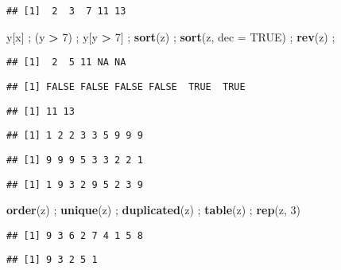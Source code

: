 \documentclass[]{article}
\newenvironment{Shaded}{\begin{snugshade}}{\end{snugshade}}
\newcommand{\DataTypeTok}[1]{\textcolor[rgb]{0.13,0.29,0.53}{#1}}
\newcommand{\DecValTok}[1]{\textcolor[rgb]{0.00,0.00,0.81}{#1}}
\newcommand{\KeywordTok}[1]{\textcolor[rgb]{0.13,0.29,0.53}{\textbf{#1}}}
\newcommand{\NormalTok}[1]{#1}
\newcommand{\OperatorTok}[1]{\textcolor[rgb]{0.81,0.36,0.00}{\textbf{#1}}}
\newcommand{\OtherTok}[1]{\textcolor[rgb]{0.56,0.35,0.01}{#1}}
\newcommand{\StringTok}[1]{\textcolor[rgb]{0.31,0.60,0.02}{#1}}
\begin{document}
\begin{verbatim}
## [1]  2  3  7 11 13
\end{verbatim}

\begin{Shaded}
\begin{Highlighting}[]
\NormalTok{y[x] ; (y }\OperatorTok{>}\StringTok{ }\DecValTok{7}\NormalTok{) ; y[y }\OperatorTok{>}\StringTok{ }\DecValTok{7}\NormalTok{] ; }\KeywordTok{sort}\NormalTok{(z) ; }\KeywordTok{sort}\NormalTok{(z, }\DataTypeTok{dec =} \OtherTok{TRUE}\NormalTok{) ; }\KeywordTok{rev}\NormalTok{(z) ;}
\end{Highlighting}
\end{Shaded}

\begin{verbatim}
## [1]  2  5 11 NA NA
\end{verbatim}

\begin{verbatim}
## [1] FALSE FALSE FALSE FALSE  TRUE  TRUE
\end{verbatim}

\begin{verbatim}
## [1] 11 13
\end{verbatim}

\begin{verbatim}
## [1] 1 2 2 3 3 5 9 9 9
\end{verbatim}

\begin{verbatim}
## [1] 9 9 9 5 3 3 2 2 1
\end{verbatim}

\begin{verbatim}
## [1] 1 9 3 2 9 5 2 3 9
\end{verbatim}

\begin{Shaded}
\begin{Highlighting}[]
\KeywordTok{order}\NormalTok{(z) ; }\KeywordTok{unique}\NormalTok{(z) ; }\KeywordTok{duplicated}\NormalTok{(z) ; }\KeywordTok{table}\NormalTok{(z) ; }\KeywordTok{rep}\NormalTok{(z, }\DecValTok{3}\NormalTok{)}
\end{Highlighting}
\end{Shaded}

\begin{verbatim}
## [1] 9 3 6 2 7 4 1 5 8
\end{verbatim}

\begin{verbatim}
## [1] 9 3 2 5 1
\end{verbatim}
\end{document}
